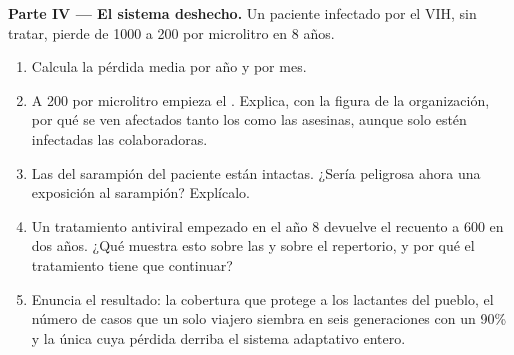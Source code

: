 \begin{problem}
\medskip
\noindent\textbf{Parte IV --- El sistema deshecho.}
Un paciente infectado por el VIH, sin tratar, pierde  de 1000 a 200 por microlitro en 8 años.
\begin{enumerate}[resume]
  \item Calcula la pérdida media por año y por mes.
  \item A 200 por microlitro empieza el . Explica, con la figura de
        la organización, por qué se ven afectados tanto los 
        como las  asesinas, aunque solo estén infectadas las
         colaboradoras.
  \item Las  del sarampión del paciente están
        intactas. ¿Sería peligrosa ahora una exposición al sarampión?
        Explícalo.
  \item Un tratamiento antiviral empezado en el año 8 devuelve el
        recuento a 600 en dos años. ¿Qué muestra esto sobre las  y sobre el repertorio, y por qué el tratamiento
        tiene que continuar?
  \item Enuncia el resultado: la cobertura que protege a los lactantes
        del pueblo, el número de casos que un solo viajero siembra en
        seis generaciones con un 90\% y la única  cuya pérdida
        derriba el sistema adaptativo entero.
\end{enumerate}
\end{problem}
